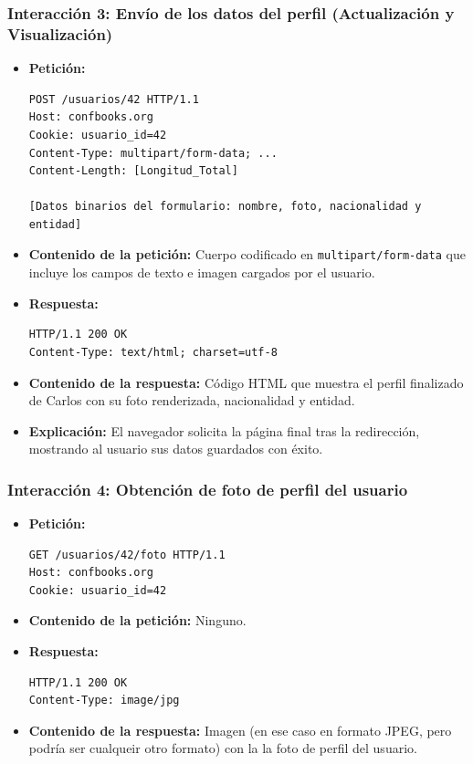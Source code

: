 \subsubsection*{Interacción 3: Envío de los datos del perfil (Actualización y Visualización)}
\begin{itemize}
    \item \textbf{Petición:}
    \begin{verbatim}
POST /usuarios/42 HTTP/1.1
Host: confbooks.org
Cookie: usuario_id=42
Content-Type: multipart/form-data; ...
Content-Length: [Longitud_Total]

[Datos binarios del formulario: nombre, foto, nacionalidad y entidad]
    \end{verbatim}
    \item \textbf{Contenido de la petición:} Cuerpo codificado en \texttt{multipart/form-data} que incluye los campos de texto e imagen cargados por el usuario.
    \item \textbf{Respuesta:}
    \begin{verbatim}
HTTP/1.1 200 OK
Content-Type: text/html; charset=utf-8
    \end{verbatim}
    \item \textbf{Contenido de la respuesta:} Código HTML que muestra el perfil finalizado de Carlos con su foto renderizada, nacionalidad y entidad.
    \item \textbf{Explicación:} El navegador solicita la página final tras la redirección, mostrando al usuario sus datos guardados con éxito.
\end{itemize}

\subsubsection*{Interacción 4: Obtención de foto de perfil del usuario}

\begin{itemize}
    \item \textbf{Petición:}
    \begin{verbatim}
GET /usuarios/42/foto HTTP/1.1
Host: confbooks.org
Cookie: usuario_id=42
    \end{verbatim}
    \item \textbf{Contenido de la petición:} Ninguno.
    \item \textbf{Respuesta:}
    \begin{verbatim}
HTTP/1.1 200 OK
Content-Type: image/jpg
    \end{verbatim}
    \item \textbf{Contenido de la respuesta:} Imagen (en ese caso en formato JPEG, pero podría ser cualqueir otro formato) con la la foto de perfil del usuario.
\end{itemize}


